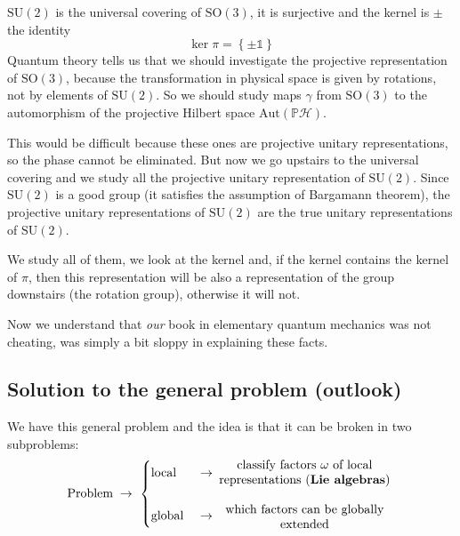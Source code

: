 \documentclass[../main.tex]{subfiles}
\begin{document}
\begin{example}
$\textrm{SU}(2)$ is the universal covering of $\textrm{SO}(3)$, it is surjective and the kernel is $\pm$ the identity
\[
\ker\pi=\left\{\pm\mathbb{1}\right\}
\]
Quantum theory tells us that we should investigate the projective representation of $\textrm{SO}(3)$, because the transformation in physical space is given by rotations, not by elements of $\textrm{SU}(2)$. So we should study maps $\gamma$ from $\textrm{SO}(3)$ to the automorphism of the projective Hilbert space $\textrm{Aut}(\mathbb{P}\mathcal{H})$.

This would be difficult because these ones are projective unitary representations, so the phase cannot be eliminated. But now we go upstairs to the universal covering and we study all the projective unitary representation of $\textrm{SU}(2)$. Since $\textrm{SU}(2)$ is a good group (it satisfies the assumption of Bargamann theorem), the projective unitary representations of $\textrm{SU}(2)$ are the true unitary representations of $\textrm{SU}(2)$. 

We study all of them, we look at the kernel and, if the kernel contains the kernel of $\pi$, then this representation will be also a representation of the group downstairs (the rotation group), otherwise it will not.
\end{example}
Now we understand that \textit{our} book in elementary quantum mechanics was not cheating, was simply a bit sloppy in explaining these facts.
\subsection{Solution to the general problem (outlook)}
We have this general problem and the idea is that it can be broken in two subproblems:
\[
\textrm{Problem}\;\to\ \begin{cases}
\textrm{local}\ &\to \text{\parbox{5 cm}{\centering classify factors $\omega$ of local representations (\textbf{Lie algebras})}}\\
&\\
\textrm{global}\ &\to \text{\parbox{5 cm}{\centering which factors can be globally extended}}
\end{cases}
\]
\end{document}
